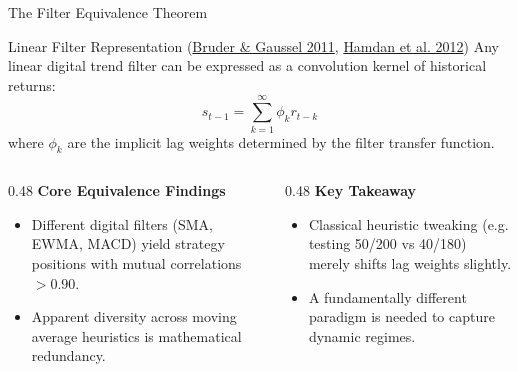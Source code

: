 \documentclass[10pt]{beamer}
\begin{document}
\begin{frame}{The Filter Equivalence Theorem}
  \begin{block}{Linear Filter Representation (\href{https://ssrn.com/abstract=2465623}{Bruder \& Gaussel 2011}, \href{http://www.thierry-roncalli.com/download/Alternative_Risk_Premia.pdf}{Hamdan et al. 2012})}
    Any linear digital trend filter can be expressed as a convolution kernel of historical returns:
    \begin{equation*}
      s_{t-1} = \sum_{k=1}^\infty \phi_k r_{t-k}
    \end{equation*}
    where $\phi_k$ are the implicit lag weights determined by the filter transfer function.
  \end{block}
  \vspace{0.1cm}
  \begin{columns}[t]
    \begin{column}{0.48\textwidth}
      \textbf{\scriptsize Core Equivalence Findings}
      \begin{itemize}\scriptsize
        \item Different digital filters (SMA, EWMA, MACD) yield strategy positions with mutual correlations $>0.90$.
        \item Apparent diversity across moving average heuristics is mathematical redundancy.
      \end{itemize}
    \end{column}
    \begin{column}{0.48\textwidth}
      \textbf{\scriptsize Key Takeaway}
      \begin{itemize}\scriptsize
        \item Classical heuristic tweaking (e.g. testing 50/200 vs 40/180) merely shifts lag weights slightly.
        \item A fundamentally different paradigm is needed to capture dynamic regimes.
      \end{itemize}
    \end{column}
  \end{columns}
\end{frame}
\end{document}
